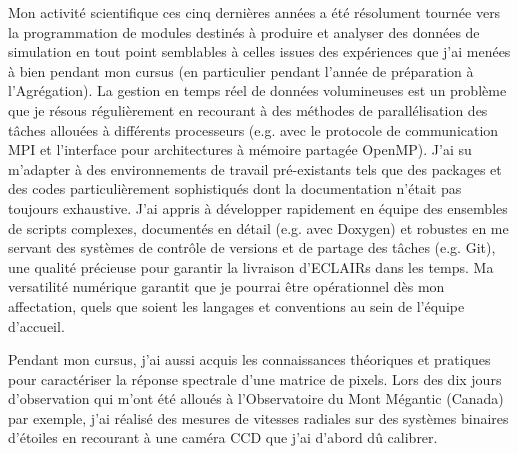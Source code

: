 \documentclass[11pt,onecolumn]{article}
\makeatletter
\newcommand*{\eg}{e.g.\@\xspace}
\makeatother
\begin{document}
Mon activité scientifique ces cinq dernières années a été résolument tournée vers la programmation de modules destinés à produire et analyser des données de simulation en tout point semblables à celles issues des expériences que j'ai menées à bien pendant mon cursus (en particulier pendant l'année de préparation à l'Agrégation). La gestion en temps réel de données volumineuses est un problème que je résous régulièrement en recourant à des méthodes de parallélisation des t\^{a}ches allouées à différents processeurs (\eg avec le protocole de communication MPI et l'interface pour architectures à mémoire partagée OpenMP). J'ai su m'adapter à des environnements de travail pré-existants tels que des packages et des codes particulièrement sophistiqués dont la documentation n'était pas toujours exhaustive. J'ai appris à développer rapidement en équipe des ensembles de scripts complexes, documentés en détail (\eg avec Doxygen) et robustes en me servant des systèmes de contrôle de versions et de partage des tâches (\eg Git), une qualité précieuse pour garantir la livraison d'ECLAIRs dans les temps. Ma versatilité numérique garantit que je pourrai être opérationnel dès mon affectation, quels que soient les langages et conventions au sein de l'équipe d'accueil.

Pendant mon cursus, j'ai aussi acquis les connaissances théoriques et pratiques pour caractériser la réponse spectrale d'une matrice de pixels. Lors des dix jours d'observation qui m'ont été alloués à l'Observatoire du Mont Mégantic (Canada) par exemple, j'ai réalisé des mesures de vitesses radiales sur des systèmes binaires d'étoiles en recourant à une caméra CCD que j'ai d'abord dû calibrer. %

%
\end{document}
